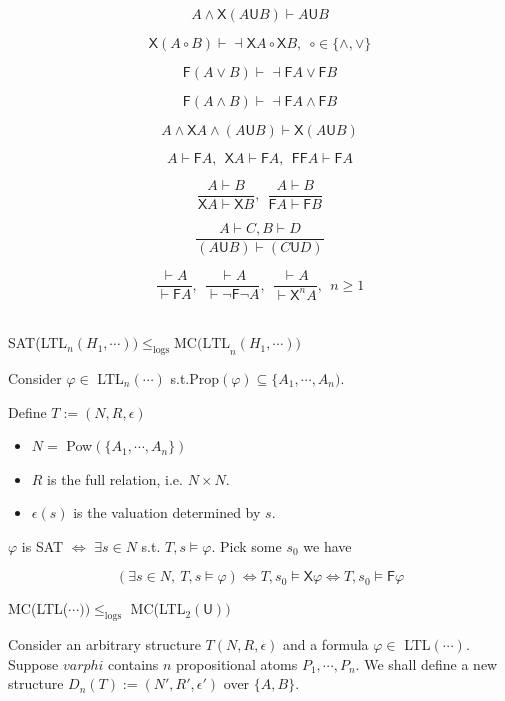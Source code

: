 \documentclass[12pt]{article}
\begin{document}
$${A\wedge \textsf{X}(A\textsf{U}B)}\vdash {A\textsf{U}B}$$

$$\textsf{X}(A\circ B)\vdash\dashv \textsf{X}A\circ\textsf{X}B,\ \ \circ\in\{\wedge,\vee\}$$

$$\textsf{F}(A\vee B)\vdash \dashv \textsf{F}A\vee\textsf{F}B$$ %

$$\textsf{F}(A\wedge B)\vdash \dashv \textsf{F}A\wedge\textsf{F}B$$ %

$${A\wedge\textsf{X}A\wedge (A\textsf{U}B)}\vdash {\textsf{X}(A\textsf{U}B)}$$

$${A}\vdash {\textsf{F}A},\ \ {\textsf{X}A}\vdash {\textsf{F}A},\ \ {\textsf{FF}A}\vdash {\textsf{F}A}$$

$$\frac{A\vdash B}{\textsf{X}A\vdash \textsf{X}B},\ \ \frac{A\vdash B}{\textsf{F}A\vdash \textsf{F}B}  $$

$$\frac{A\vdash C, B\vdash D}{(A\textsf{U}B)\vdash (C\textsf{U}D)}$$

$$\frac{\vdash A}{\vdash \textsf{F}A}, \ \ \frac{\vdash A}{\vdash \neg \textsf{F}\neg A},\ \ \frac{\vdash A}{\vdash \textsf{X}^nA},\ \ n\geq 1$$

\ \\

SAT(LTL$_n(H_1,\cdots))\leq_{\text{logs}}\mbox{MC(LTL}_n(H_1,\cdots))$

Consider $\varphi\in$ LTL$_n(\cdots)$ s.t.Prop$(\varphi)\subseteq\{A_1,\cdots, A_n)$.

Define $T:=(N, R, \epsilon)$ 

\begin{itemize}
\item $N=$ Pow$(\{A_1,\cdots, A_n\})$

\item $R$ is the full relation, i.e. $N\times N$.

\item $\epsilon(s)$ is the valuation determined by $s$.
\end{itemize}

$\varphi$ is SAT  $\Longleftrightarrow$ $\exists s\in N$ s.t. $T,s\models \varphi$. Pick some $s_0$ we have

$$(\exists s\in N,\ T,s\models \varphi) \Longleftrightarrow T,s_0\models \textsf{X}\varphi\Longleftrightarrow T,s_0\models\textsf{F}\varphi$$


MC(LTL($\cdots))\leq_{\text{logs}}$ MC(LTL$_2(\textsf{U}))$ 

Consider an arbitrary structure $T(N,R,\epsilon)$ and a formula $\varphi\in$ LTL$(\cdots)$. Suppose $varphi$ contains $n$ propositional atoms $P_1,\cdots, P_n$. 
We shall define a new structure $D_n(T):=(N',R',\epsilon')$ over $\{A,B\}$.
\end{document}
